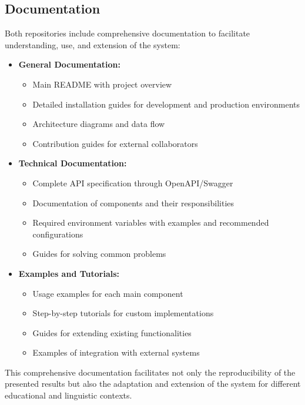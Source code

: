 \subsection{Documentation}
\label{subsec:documentacion-repositorios}

Both repositories include comprehensive documentation to facilitate understanding, use, and extension of the system:

\begin{itemize}
    \item \textbf{General Documentation:}
    \begin{itemize}
        \item Main README with project overview
        \item Detailed installation guides for development and production environments
        \item Architecture diagrams and data flow
        \item Contribution guides for external collaborators
    \end{itemize}
    
    \item \textbf{Technical Documentation:}
    \begin{itemize}
        \item Complete API specification through OpenAPI/Swagger
        \item Documentation of components and their responsibilities
        \item Required environment variables with examples and recommended configurations
        \item Guides for solving common problems
    \end{itemize}
    
    \item \textbf{Examples and Tutorials:}
    \begin{itemize}
        \item Usage examples for each main component
        \item Step-by-step tutorials for custom implementations
        \item Guides for extending existing functionalities
        \item Examples of integration with external systems
    \end{itemize}
\end{itemize}

This comprehensive documentation facilitates not only the reproducibility of the presented results but also the adaptation and extension of the system for different educational and linguistic contexts.


